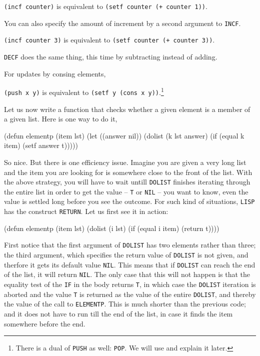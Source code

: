 \documentclass[a4paper,11pt]{article}
\begin{document}
\begin{uenum}
\Verb+(incf counter)+ is equivalent to \Verb=(setf counter (+ counter 1))=. 

You can also specify the amount of increment by a second argument to \Verb+INCF+. 

\Verb+(incf counter 3)+ is equivalent to \Verb=(setf counter (+ counter 3))=. 

\Verb+DECF+ does the same thing, this time by subtracting instead of adding. 

For updates by consing elements, 

\Verb+(push x y)+ is equivalent to \Verb+(setf y (cons x y))+.\footnote{There is a dual of \Verb+PUSH+ as well: \Verb+POP+. We will use and explain it later.} 

\item Let us now write a function that checks whether a given element is a member of a given list. Here is one way to do it, 

\begin{lispcode}
(defun elementp (item lst)
  (let ((answer nil))
	(dolist (k lst answer)
	  (if (equal k item)
		(setf answer t)))))
\end{lispcode}

So nice. But there is one efficiency issue. Imagine you are given a very long list and the item you are looking for is somewhere close to the front of the list. With the above strategy, you will have to wait untill \Verb+DOLIST+ finishes iterating through the entire list in order to get the value -- \Verb+T+ or \Verb+NIL+ -- you want to know, even the value is settled long before you see the outcome. For such kind of situations, \Verb+LISP+ has the construct \Verb+RETURN+. Let us first see it in action: 

\begin{lispcode}
(defun elementp (item lst)
  (dolist (i lst)
	(if (equal i item)
	  (return t))))
\end{lispcode}

First notice that the first argument of \Verb+DOLIST+ has two elements rather than three; the third argument, which specifies the return value of \Verb+DOLIST+ is not given, and therfore it gets its default value \Verb+NIL+. This means that if \Verb+DOLIST+ can reach the end of the list, it will return \Verb+NIL+. The only case that this will not happen is that the equality test of the \Verb+IF+ in the body returns \Verb+T+, in which case the \Verb+DOLIST+ iteration is aborted and the value \Verb+T+ is returned as the value of the entire \Verb+DOLIST+, and thereby the value of the call to \Verb+ELEMENTP+. This is much shorter than the previous code; and it does not have to run till the end of the list, in case it finds the item somewhere before the end. 


\end{uenum}
\end{document}
